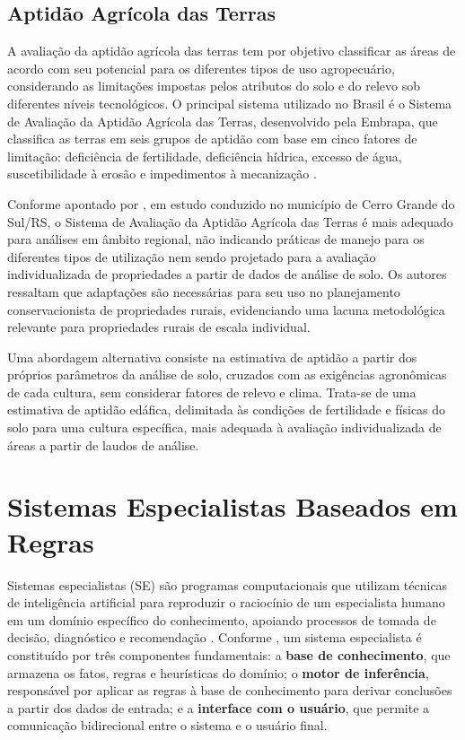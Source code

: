 \subsection{Aptidão Agrícola das Terras}

A avaliação da aptidão agrícola das terras tem por objetivo classificar
as áreas de acordo com seu potencial para os diferentes tipos de uso
agropecuário, considerando as limitações impostas pelos atributos do solo
e do relevo sob diferentes níveis tecnológicos. O principal sistema utilizado
no Brasil é o Sistema de Avaliação da Aptidão Agrícola das Terras, desenvolvido
pela Embrapa, que classifica as terras em seis grupos de aptidão com base em
cinco fatores de limitação: deficiência de fertilidade, deficiência hídrica,
excesso de água, suscetibilidade à erosão e impedimentos à mecanização
\citep{EmbrapaAptidao2025}.

Conforme apontado por \cite{Hofig2015}, em estudo conduzido no município de
Cerro Grande do Sul/RS, o Sistema de Avaliação da Aptidão Agrícola das Terras
é mais adequado para análises em âmbito regional, não indicando práticas de
manejo para os diferentes tipos de utilização nem sendo projetado para a
avaliação individualizada de propriedades a partir de dados de análise de solo.
Os autores ressaltam que adaptações são necessárias para seu uso no planejamento
conservacionista de propriedades rurais, evidenciando uma lacuna metodológica
relevante para propriedades rurais de escala individual.

Uma abordagem alternativa consiste na estimativa de aptidão a partir dos
próprios parâmetros da análise de solo, cruzados com as exigências agronômicas
de cada cultura, sem considerar fatores de relevo e clima. Trata-se de uma
estimativa de aptidão edáfica, delimitada às condições de fertilidade e físicas
do solo para uma cultura específica, mais adequada à avaliação individualizada
de áreas a partir de laudos de análise.

\section{Sistemas Especialistas Baseados em Regras}

Sistemas especialistas (SE) são programas computacionais que utilizam
técnicas de inteligência artificial para reproduzir o raciocínio de um
especialista humano em um domínio específico do conhecimento, apoiando
processos de tomada de decisão, diagnóstico e recomendação
\citep{SantosEtAl1994}. Conforme \cite{SantosEtAl1994}, um sistema
especialista é constituído por três componentes fundamentais: a
\textbf{base de conhecimento}, que armazena os fatos, regras e heurísticas
do domínio; o \textbf{motor de inferência}, responsável por aplicar as
regras à base de conhecimento para derivar conclusões a partir dos dados
de entrada; e a \textbf{interface com o usuário}, que permite a comunicação
bidirecional entre o sistema e o usuário final.


